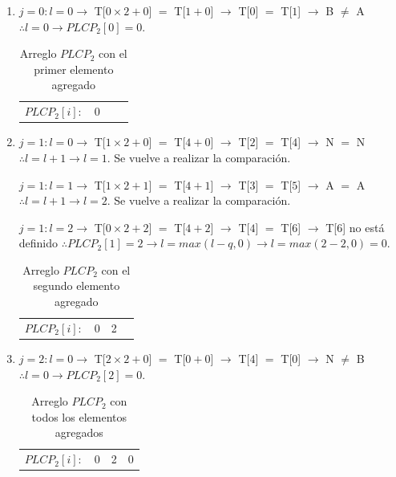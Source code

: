 \begin{enumerate}

\item $j=0: l=0 \rightarrow$ T[$0 \times 2+0$] $=$ T[$1+0$] $\rightarrow$ T[$0$] $=$ T[$1$] $\rightarrow$ B $\neq$ A $\therefore l=0 \rightarrow PLCP_{2}[0] = 0$.

\begin{table}[!htb]
\centering
\begin{tabular}{c|c|c|c|}
\cline{2-4}
$PLCP_{2}[i]:$ & 0 &  & \\ \cline{2-4}
\end{tabular}
\caption{Arreglo $PLCP_{2}$ con el primer elemento agregado}
\end{table}

\item $j=1: l=0 \rightarrow$ T[$1 \times 2+0$] $=$ T[$4+0$] $\rightarrow$ T[$2$] $=$ T[$4$] $\rightarrow$ N $=$ N $\therefore l=l+1 \rightarrow l=1$. Se vuelve a realizar la comparación.

$j=1: l=1 \rightarrow$ T[$1 \times 2+1$] $=$ T[$4+1$] $\rightarrow$ T[$3$] $=$ T[$5$] $\rightarrow$ A $=$ A $\therefore l=l+1 \rightarrow l=2$. Se vuelve a realizar la comparación.

$j=1: l=2 \rightarrow$ T[$0 \times 2+2$] $=$ T[$4+2$] $\rightarrow$ T[$4$] $=$ T[$6$] $\rightarrow$ T[$6$] no está definido $\therefore PLCP_{2}[1] = 2 \rightarrow l=max(l-q,0) \rightarrow l=max(2-2,0) = 0$.


\begin{table}[!htb]
\centering
\begin{tabular}{c|c|c|c|}
\cline{2-4}
$PLCP_{2}[i]:$ & 0 & 2 & \\ \cline{2-4}
\end{tabular}
\caption{Arreglo $PLCP_{2}$ con el segundo elemento agregado}
\end{table}

\item $j=2: l=0 \rightarrow$ T[$2 \times 2+0$] $=$ T[$0+0$] $\rightarrow$ T[$4$] $=$ T[$0$] $\rightarrow$ N $\neq$ B $\therefore l=0 \rightarrow PLCP_{2}[2] = 0$.

\begin{table}[!htb]
\centering
\begin{tabular}{c|c|c|c|}
\cline{2-4}
$PLCP_{2}[i]:$ & 0 & 2 & 0\\ \cline{2-4}
\end{tabular}
\caption{Arreglo $PLCP_{2}$ con todos los elementos agregados}
\end{table}

\end{enumerate}

